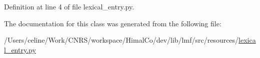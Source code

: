 Definition at line 4 of file lexical\+\_\+entry.\+py.



The documentation for this class was generated from the following file\+:\begin{DoxyCompactItemize}
\item 
/\+Users/celine/\+Work/\+C\+N\+R\+S/workspace/\+Himal\+Co/dev/lib/lmf/src/resources/\hyperlink{resources_2lexical__entry_8py}{lexical\+\_\+entry.\+py}\end{DoxyCompactItemize}
